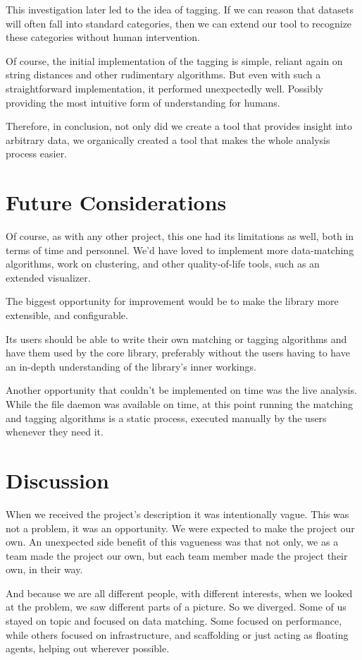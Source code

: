 This investigation later led to the idea of tagging.
If we can reason that datasets will often fall into standard categories,
then we can extend our tool to recognize these categories without human intervention.

Of course, the initial implementation of the tagging is simple, reliant again on
string distances and other rudimentary algorithms.
But even with such a straightforward implementation, it performed unexpectedly well.
Possibly providing the most intuitive form of understanding for humans.

Therefore, in conclusion, not only did we create a tool that provides insight into arbitrary data,
we organically created a tool that makes the whole analysis process easier.


\section{Future Considerations}
Of course, as with any other project, this one had its limitations as well, both
in terms of time and personnel.
We'd have loved to implement more data-matching algorithms,
work on clustering, and other quality-of-life tools, such as an extended visualizer.

The biggest opportunity for improvement would be to make the library more extensible,
and configurable.

Its users should be able to write their own matching or tagging algorithms and have
them used by the core library, preferably without the users having to have an in-depth
understanding of the library's inner workings.

Another opportunity that couldn't be implemented on time was the live analysis.
While the file daemon was available on time, at this point running the matching
and tagging algorithms is a static process, executed manually by the users
whenever they need it.


\section{Discussion}

When we received the project's description it was intentionally vague.
This was not a problem, it was an opportunity.
We were expected to make the project our own.
An unexpected side benefit of this vagueness was that not only, we as a team
made the project our own, but each team member made the project their own, in their way.

And because we are all different people, with different interests, when we looked at the problem, we saw different parts of a picture.
So we diverged.
Some of us stayed on topic and focused on data matching.
Some focused on performance, while others focused on infrastructure, and scaffolding or
just acting as floating agents, helping out wherever possible.


